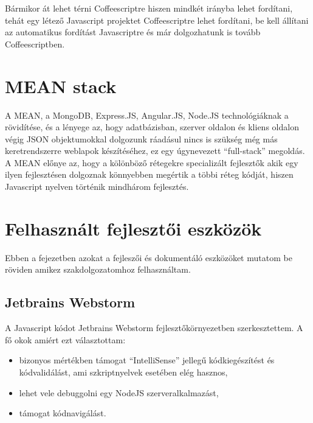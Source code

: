 Bármikor át lehet térni Coffeescriptre hiszen mindkét irányba lehet fordítani, tehát egy létező Javascript projektet Coffeescriptre lehet fordítani, be kell állítani az automatikus fordítást Javascriptre és már dolgozhatunk is tovább Coffeescriptben.















\section{MEAN stack}


A MEAN, a MongoDB, Express.JS, Angular.JS, Node.JS technológiáknak a rövidítése, és a lényege az, hogy adatbázisban, szerver oldalon és kliens oldalon végig JSON objektumokkal dolgozunk ráadásul nincs is szükség még más keretrendszerre weblapok készítéséhez, ez egy úgynevezett ``full-stack'' megoldás. A MEAN előnye az, hogy a kölönböző rétegekre specializált fejlesztők akik egy ilyen fejlesztésen dolgoznak könnyebben megértik a többi réteg kódját, hiszen Javascript nyelven történik mindhárom fejlesztés. 


\section{Felhasznált fejlesztői eszközök}

Ebben a fejezetben azokat a fejleszői és dokumentáló eszközöket mutatom be röviden amikez szakdolgozatomhoz felhasználtam.

\subsection{Jetbrains Webstorm}

A Javascript kódot Jetbrains Webstorm fejlesztőkörnyezetben szerkesztettem. A fő okok amiért ezt választottam:
\begin{itemize}
\item bizonyos mértékben támogat ``IntelliSense'' jellegű kódkiegészítést és kódvalidálást, ami szkriptnyelvek esetében elég hasznos,
\item lehet vele debuggolni egy NodeJS szerveralkalmazást,
\item támogat kódnavigálást.

\end{itemize}

